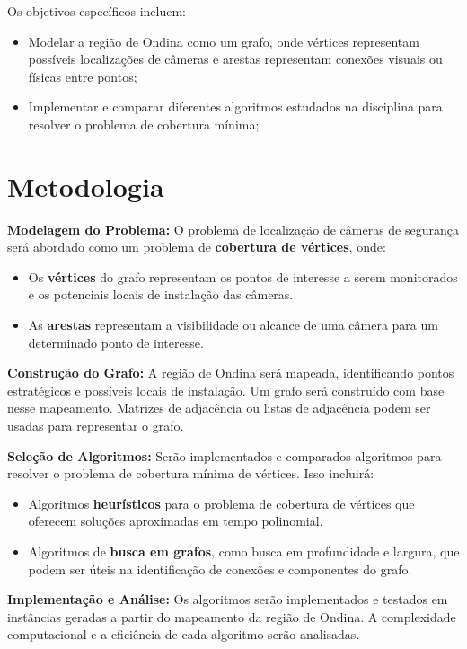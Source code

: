 \documentclass[12pt, a4paper]{report}
\begin{document}
Os objetivos específicos incluem:
\begin{itemize}
    \item Modelar a região de Ondina como um grafo, onde vértices representam possíveis localizações de câmeras e arestas representam conexões visuais ou físicas entre pontos;
    \item Implementar e comparar diferentes algoritmos estudados na disciplina para resolver o problema de cobertura mínima;
\end{itemize}

\section{Metodologia}
\textbf{Modelagem do Problema:} O problema de localização de câmeras de segurança será abordado como um problema de \textbf{cobertura de vértices}, onde:
\begin{itemize}
    \item Os \textbf{vértices} do grafo representam os pontos de interesse a serem monitorados e os potenciais locais de instalação das câmeras.
    \item As \textbf{arestas} representam a visibilidade ou alcance de uma câmera para um determinado ponto de interesse.
\end{itemize}

\textbf{Construção do Grafo:} A região de Ondina será mapeada, identificando pontos estratégicos e possíveis locais de instalação. Um grafo será construído com base nesse mapeamento. Matrizes de adjacência ou listas de adjacência podem ser usadas para representar o grafo.

\textbf{Seleção de Algoritmos:} Serão implementados e comparados algoritmos para resolver o problema de cobertura mínima de vértices. Isso incluirá:
\begin{itemize}
    \item Algoritmos \textbf{heurísticos} para o problema de cobertura de vértices que oferecem soluções aproximadas em tempo polinomial.
    \item Algoritmos de \textbf{busca em grafos}, como busca em profundidade e largura, que podem ser úteis na identificação de conexões e componentes do grafo.
\end{itemize}

\textbf{Implementação e Análise:} Os algoritmos serão implementados e testados em instâncias geradas a partir do mapeamento da região de Ondina. A complexidade computacional e a eficiência de cada algoritmo serão analisadas.
\end{document}
